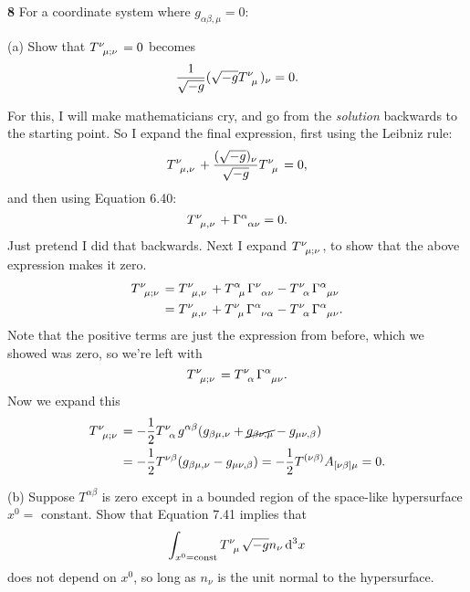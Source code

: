 \documentclass[gr-notes.tex]{subfiles}
\begin{document}
\textbf{8}
For a coordinate system where $g_{\alpha\beta,\mu} = 0$:

(a) Show that $\tensor{T}{^\nu_{\mu;\nu}} = 0$ becomes
%
\begin{displaymath}
  \frac{1}{\sqrt{-g}} (\sqrt{-g} \tensor{T}{^\nu_\mu})_\nu = 0.
\end{displaymath}

For this, I will make mathematicians cry, and go from the \emph{solution} backwards to the starting point. So I expand the final expression, first using the Leibniz rule:
%
\begin{displaymath}
  \tensor{T}{^\nu_{\mu,\nu}} +
  \frac{(\sqrt{-g})_\nu}{\sqrt{-g}} \tensor{T}{^\nu_\mu} =
  0,
\end{displaymath}
%
and then using Equation 6.40:
%
\begin{displaymath}
  \tensor{T}{^\nu_{\mu,\nu}} +
  \tensor{\Gamma}{^\alpha_{\alpha\nu}} =
  0.
\end{displaymath}
%
Just pretend I did that backwards. Next I expand $\tensor{T}{^\nu_{\mu;\nu}}$, to show that the above expression makes it zero.
%
\begin{align*}
  \tensor{T}{^\nu_{\mu;\nu}} &=
  \tensor{T}{^\nu_{\mu,\nu}} +
  \tensor{T}{^\alpha_\mu} \tensor{\Gamma}{^\nu_{\alpha\nu}} -
  \tensor{T}{^\nu_\alpha} \tensor{\Gamma}{^\alpha_{\mu\nu}}
  \\ &=
  \tensor{T}{^\nu_{\mu,\nu}} +
  \tensor{T}{^\nu_\mu} \tensor{\Gamma}{^\alpha_{\nu\alpha}} -
  \tensor{T}{^\nu_\alpha} \tensor{\Gamma}{^\alpha_{\mu\nu}}.
\end{align*}
%
Note that the positive terms are just the expression from before, which we showed was zero, so we're left with
%
\begin{displaymath}
  \tensor{T}{^\nu_{\mu;\nu}} =
  \tensor{T}{^\nu_\alpha} \tensor{\Gamma}{^\alpha_{\mu\nu}}.
\end{displaymath}
%
Now we expand this
%
\begin{align*}
  \tensor{T}{^\nu_{\mu;\nu}} &=
  -\frac{1}{2} \tensor{T}{^\nu_\alpha} g^{\alpha\beta}
  (g_{\beta\mu,\nu} + \cancel{g_{\beta\nu,\mu}} - g_{\mu\nu,\beta})
  \\ &=
  -\frac{1}{2} \tensor{T}{^{\nu\beta}}
  (g_{\beta\mu,\nu} - g_{\mu\nu,\beta}) =
  -\frac{1}{2} \tensor{T}{^{(\nu\beta)}}
  A_{[\nu\beta]\mu} =
  0.
\end{align*}

(b) Suppose $T^{\alpha\beta}$ is zero except in a bounded region of the space-like hypersurface $x^0 =$ constant. Show that Equation 7.41 implies that
%
\begin{displaymath}
  \int_{x^0 = \mathrm{const}} \tensor{T}{^\nu_\mu} \sqrt{-g} n_\nu \dd[3]{x}
\end{displaymath}
%
does not depend on $x^0$, so long as $n_\nu$ is the unit normal to the hypersurface.
\end{document}

